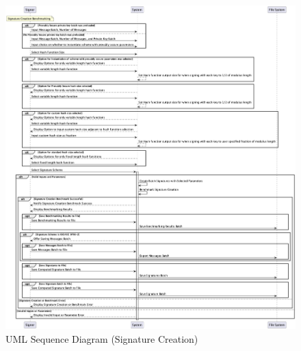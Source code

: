 \documentclass[]{final_report}
\theoremstyle{definition}
\begin{document}
\begin{figure}[H]
    \centering
    \includegraphics[scale=0.34]{main_pictures/sequenceSign.png}
    \caption{UML Sequence Diagram (Signature Creation)}
    \label{fig:uc}
\end{figure}
\end{document}
